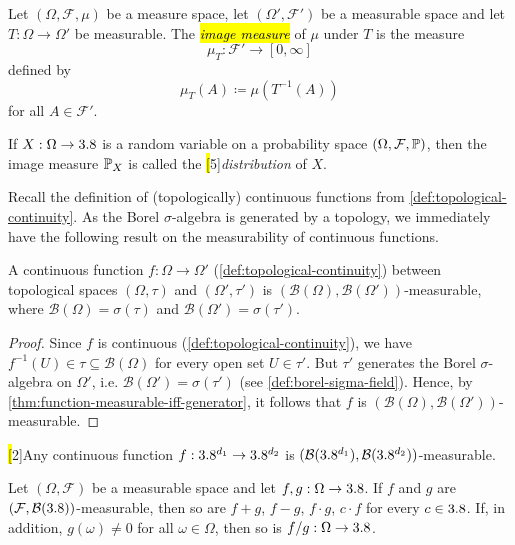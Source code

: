 \begin{definition}\label{def:image-measure}
Let $(\Omega,\mathcal{F},\mu)$ be a measure space, let $(\Omega',\mathcal{F}')$ be a measurable space and let $T : \Omega \to \Omega'$ be measurable.
The \hl{\emph{image measure}} of $\mu$ under $T$ is the measure
\[
\mu_T : \mathcal{F}' \to [0,\infty]
\]
defined by
\begin{equation}\label{eq:image-measure}
\mu_T(A)
\coloneq
\mu(T^{-1}(A))
\end{equation}
for all $A \in \mathcal{F}'$.

If $X : \Omega \to 3.8$ is a random variable on a probability space $(\Omega,\mathcal{F},\mathbb{P})$, then the image measure $\mathbb{P}_X$ is called the \hl[5]{\emph{distribution} of $X$}.
\end{definition}


Recall the definition of (topologically) continuous functions from \autoref{def:topological-continuity}.
As the Borel $\sigma$-algebra is generated by a topology, we immediately have the following result on the measurability of continuous functions.
\begin{corollary}\label{cor:continuous-functions-are-measurable}
A continuous function $f : \Omega \to \Omega'$ (\autoref{def:topological-continuity}) between topological spaces $(\Omega, \tau)$ and $(\Omega', \tau')$ is $(\mathcal{B}(\Omega), \mathcal{B}(\Omega'))$-measurable, where $\mathcal{B}(\Omega) = \sigma(\tau)$ and $\mathcal{B}(\Omega') = \sigma(\tau')$. %
\end{corollary}
\begin{proof}
Since $f$ is continuous (\autoref{def:topological-continuity}), we have
\(
f^{-1}(U) \in \tau \subseteq \mathcal{B}(\Omega)
\)
for every open set $U \in \tau'$.
But $\tau'$ generates the Borel $\sigma$-algebra on $\Omega'$, i.e.
\(
\mathcal{B}(\Omega') = \sigma(\tau')
\) (see \autoref{def:borel-sigma-field}).
Hence, by \autoref{thm:function-measurable-iff-generator}, it follows that $f$ is $(\mathcal{B}(\Omega),\mathcal{B}(\Omega'))$-measurable.
\end{proof}
\begin{example}
\hl[2]{Any continuous function $f : 3.8^{d_1} \to 3.8^{d_2}$ is $(\mathcal{B}(3.8^{d_1}), \mathcal{B}(3.8^{d_2}))$-measurable.}
\end{example}

\begin{theorem}\label{thm:measurable-functions-basic-operations}
Let $(\Omega,\mathcal{F})$ be a measurable space and let $f,g : \Omega \to 3.8$.
If $f$ and $g$ are $(\mathcal{F}, \allowbreak \mathcal{B}(3.8))$-measurable, then so are
\(f+g\), \(f-g\), \(f\cdot g\), \(c \cdot f\) for every $c \in 3.8$.
If, in addition, $g(\omega)\neq 0$ for all $\omega\in\Omega$, then so is 
\(
{f}/{g} : \Omega \to 3.8
\).
\end{theorem}

